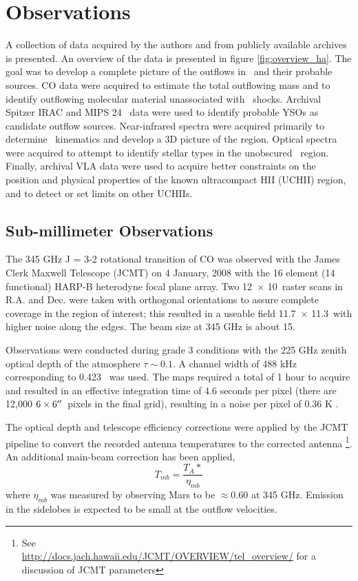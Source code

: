 \section{Observations}

A collection of data acquired by the authors and from publicly
available archives is presented.  An overview of the data is presented in figure
\ref{fig:overview_ha}. The goal was to develop a complete picture of the outflows
in \region\ and their probable sources.  CO data were acquired to estimate the
total outflowing mass and to identify outflowing molecular material
unassociated with \hh\ shocks.  Archival Spitzer IRAC and MIPS 24 \um\ data
were used to identify probable YSOs as candidate outflow sources.
Near-infrared spectra were acquired primarily to determine \hh\ kinematics and
develop a 3D picture of the region.  Optical spectra were acquired to attempt
to identify stellar types in the unobscured \swcluster\ region.  Finally,
archival VLA data were used to acquire better constraints on the position and
physical properties of the known ultracompact HII (UCHII) region, and to detect
or set limits on other UCHIIs.

\subsection{Sub-millimeter Observations}

The 345 GHz J = 3-2 rotational transition of CO was observed with the James
Clerk Maxwell Telescope (JCMT) on 4 January,  2008 with the 16 element (14
functional) HARP-B heterodyne focal plane array.   Two  12\arcmin\ $\times$
10\arcmin\  raster scans in R.A.  and Dec.  were taken with orthogonal
orientations to assure complete coverage in the region of interest; this
resulted in a useable field 11.7\arcmin\ $\times$ 11.3\arcmin\ with higher noise
along the edges.  The beam size at 345 GHz is about 15\arcsec.

Observations were conducted during grade 3 conditions with the 225 GHz zenith
optical depth of the atmosphere $\tau\sim0.1$. A channel width of 488 kHz
corresponding to 0.423 \kms\ was used.    The maps required a total of 1 hour
to acquire and resulted in an effective integration time of 4.6 seconds per
pixel (there are 12,000 $6\times6\mbox{$^{\prime\prime}$}$\ pixels in the final grid), resulting
in a noise per pixel of 0.36 K \kms.

The optical depth and telescope efficiency corrections were applied by the JCMT
pipeline to convert the recorded antenna temperatures to the corrected antenna
\footnote{See \\
\url{http://docs.jach.hawaii.edu/JCMT/OVERVIEW/tel\_overview/} for a discussion
of JCMT parameters}.  An additional
main-beam correction has been applied, $$T_{mb}=\frac{T_A*}{\eta_{mb}}$$ where
$\eta_{mb} $ was measured by observing Mars to be $\approx0.60$ at 345
GHz.  Emission in the sidelobes is expected to be small at the outflow velocities.

